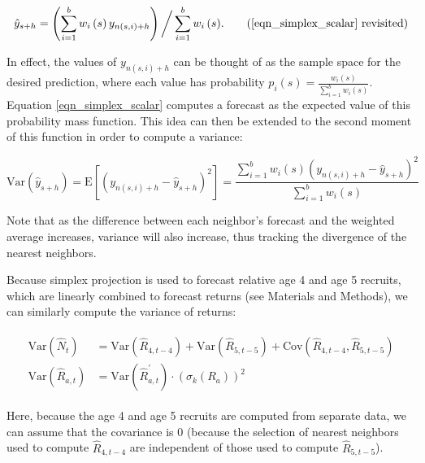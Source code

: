 \begin{equation*}
\hat{y}_{s+h} = \left(\sum_{i=1}^{b}{w_i\left(s\right)y_{n(s, i)+h}}\right) \bigg/ \sum_{i=1}^{b}{w_i\left(s\right)}. \tag{\ref{eqn_simplex_scalar} revisited}
\end{equation*}

In effect, the values of $y_{n(s, i)+h}$ can be thought of as the sample space for the desired prediction, where each value has probability $p_i(s) = \frac{w_i(s)}{\sum_{i=1}^{b}{w_i(s)}}$. Equation \ref{eqn_simplex_scalar} computes a forecast as the expected value of this probability mass function. This idea can then be extended to the second moment of this function in order to compute a variance:

\begin{equation}
\mathrm{Var}\left(\hat{y}_{s+h}\right) = \mathrm{E}\left[\left(y_{n(s, i)+h} - \hat{y}_{s+h}\right)^2\right] = \frac{\sum_{i=1}^{b}{w_i(s)\left(y_{n(s, i)+h} - \hat{y}_{s+h}\right)^2}}{\sum_{i=1}^{b}{w_i\left(s\right)}}
\end{equation}

Note that as the difference between each neighbor's forecast and the weighted average increases, variance will also increase, thus tracking the divergence of the nearest neighbors.

Because simplex projection is used to forecast relative age 4 and age 5 recruits, which are linearly combined to forecast returns (see Materials and Methods), we can similarly compute the variance of returns:

\begin{align}
\begin{split}
\mathrm{Var}\left(\hat{N}_t\right) &= \mathrm{Var}\left(\hat{R}_{4, t-4}\right) + \mathrm{Var}\left(\hat{R}_{5, t-5}\right) + \mathrm{Cov}\left(\hat{R}_{4, t-4}, \hat{R}_{5, t-5}\right)\\
\mathrm{Var}\left(\hat{R}_{a, t}\right) &= \mathrm{Var}\left(\hat{R}_{a, t}^\prime\right) \cdot \left(\sigma_k\left(R_a\right)\right)^2
\end{split}
\end{align}

Here, because the age 4 and age 5 recruits are computed from separate data, we can assume that the covariance is 0 (because the selection of nearest neighbors used to compute $\hat{R}_{4, t-4}$ are independent of those used to compute $\hat{R}_{5, t-5}$).

